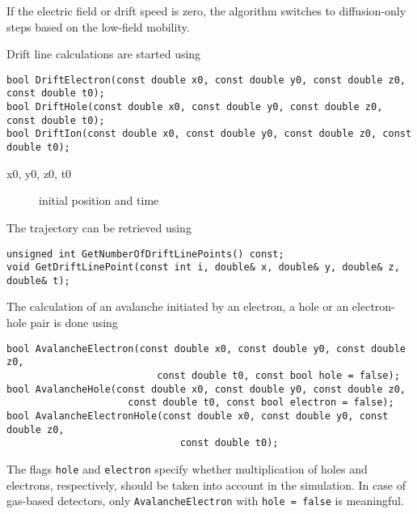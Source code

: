 If the electric field or drift speed is zero, the algorithm switches 
to diffusion-only steps based on the low-field mobility.

Drift line calculations are started using 
\begin{lstlisting}
bool DriftElectron(const double x0, const double y0, const double z0, const double t0);
bool DriftHole(const double x0, const double y0, const double z0, const double t0);
bool DriftIon(const double x0, const double y0, const double z0, const double t0);
\end{lstlisting}
\begin{description}
  \item[x0, y0, z0, t0] initial position and time
\end{description}
The trajectory can be retrieved using
\begin{lstlisting} 
unsigned int GetNumberOfDriftLinePoints() const;
void GetDriftLinePoint(const int i, double& x, double& y, double& z, double& t);
\end{lstlisting}

The calculation of an avalanche initiated by an electron, 
a hole or an electron-hole pair is done using
\begin{lstlisting}
bool AvalancheElectron(const double x0, const double y0, const double z0,
                          const double t0, const bool hole = false);
bool AvalancheHole(const double x0, const double y0, const double z0,
                     const double t0, const bool electron = false);
bool AvalancheElectronHole(const double x0, const double y0, const double z0, 
                              const double t0);
\end{lstlisting}
The flags \texttt{hole} and \texttt{electron} specify whether 
multiplication of holes and electrons, respectively, should be 
taken into account in the simulation. 
In case of gas-based detectors, only \texttt{AvalancheElectron} with 
\texttt{hole = false} is meaningful. 

